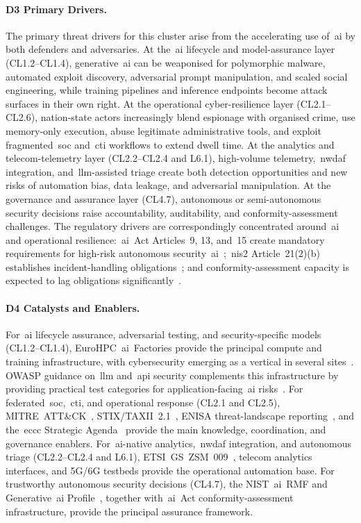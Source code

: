 \documentclass{ieeeaccess}
\begin{document}
\paragraph{D3 Primary Drivers.}
The primary threat drivers for this cluster arise from the accelerating use of~\gls{ai} by both defenders and adversaries. At the~\gls{ai} lifecycle and model-assurance layer (CL1.2--CL1.4), generative~\gls{ai} can be weaponised for polymorphic malware, automated exploit discovery, adversarial prompt manipulation, and scaled social engineering, while training pipelines and inference endpoints become attack surfaces in their own right. At the operational cyber-resilience layer (CL2.1--CL2.6), nation-state actors increasingly blend espionage with organised crime, use memory-only execution, abuse legitimate administrative tools, and exploit fragmented~\gls{soc} and~\gls{cti} workflows to extend dwell time. At the analytics and telecom-telemetry layer (CL2.2--CL2.4 and L6.1), high-volume telemetry,~\gls{nwdaf} integration, and~\gls{llm}-assisted triage create both detection opportunities and new risks of automation bias, data leakage, and adversarial manipulation. At the governance and assurance layer (CL4.7), autonomous or semi-autonomous security decisions raise accountability, auditability, and conformity-assessment challenges. The regulatory drivers are correspondingly concentrated around~\gls{ai} and operational resilience:~\gls{ai}~Act Articles~9, 13, and~15 create mandatory requirements for high-risk autonomous security~\gls{ai}~\cite{euaiact};~\gls{nis2} Article~21(2)(b) establishes incident-handling obligations~\cite{eunis2}; and conformity-assessment capacity is expected to lag obligations significantly~\cite{ep2026aiact}.

\paragraph{D4 Catalysts and Enablers.}

For~\gls{ai} lifecycle assurance, adversarial testing, and security-specific models (CL1.2--CL1.4), EuroHPC~\gls{ai}~Factories provide the principal compute and training infrastructure, with cybersecurity emerging as a vertical in several sites~\cite{eurohpcaifactories}. OWASP guidance on~\gls{llm} and~\gls{api} security complements this infrastructure by providing practical test categories for application-facing~\gls{ai} risks~\cite{owaspllm,owaspapi}. For federated~\gls{soc},~\gls{cti}, and operational response (CL2.1 and CL2.5), MITRE~ATT\&CK~\cite{mitre2020}, STIX/TAXII~2.1~\cite{stix21,taxii21}, ENISA threat-landscape reporting~\cite{enisaetl2025}, and the~\gls{eccc} Strategic Agenda~\cite{eccc2024} provide the main knowledge, coordination, and governance enablers. For~\gls{ai}-native analytics,~\gls{nwdaf} integration, and autonomous triage (CL2.2--CL2.4 and L6.1), ETSI~GS~ZSM~009~\cite{etsizsm}, telecom analytics interfaces, and 5G/6G testbeds provide the operational automation base. For trustworthy autonomous security decisions (CL4.7), the NIST~\gls{ai}~RMF and Generative~\gls{ai} Profile~\cite{nistairmf,nistaigenai}, together with~\gls{ai}~Act conformity-assessment infrastructure, provide the principal assurance framework.
\end{document}
